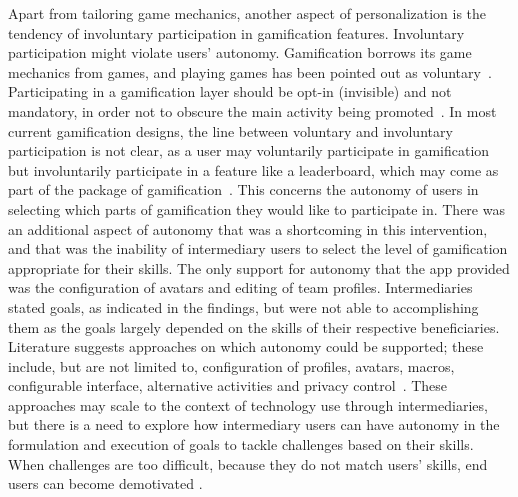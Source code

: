 Apart from tailoring game mechanics, another aspect of personalization is  the tendency of involuntary participation in gamification features. Involuntary participation might violate users' autonomy. Gamification borrows its game mechanics from games, and playing games has been pointed out as voluntary~\citep{seaborn2015:gamification,knaving2013designing}. Participating in a gamification layer should be opt-in (invisible) and not mandatory, in order not to obscure the main activity being promoted~\citep{knaving2013designing}. In most current gamification designs, the line between voluntary and involuntary participation is not clear, as a user may voluntarily participate in gamification but involuntarily participate in a feature like a leaderboard, which may come as part of the package of gamification~\citep{ferro2013towards}. This concerns the autonomy of users in selecting which parts of gamification they would like to participate in. There was an additional aspect of autonomy that was a shortcoming in this intervention, and that was the inability of intermediary users to select the level of gamification appropriate for their skills. The only support for autonomy that the app provided was the configuration of avatars and editing of team profiles. Intermediaries stated goals, as indicated in the findings, but were not able to accomplishing them as the goals largely depended on the skills of their respective beneficiaries. Literature suggests approaches on which autonomy could be supported; these include, but are not limited to, configuration of profiles, avatars, macros, configurable interface, alternative activities and privacy control~\citep{francisco2012analysis}. These approaches may scale to the context of technology use through intermediaries, but there is a need to explore how intermediary users can have autonomy in the formulation and execution of goals to tackle challenges based on their skills. When challenges are too difficult, because they do not match users' skills, end users can become demotivated \citep{zhang2008motivational}.    

